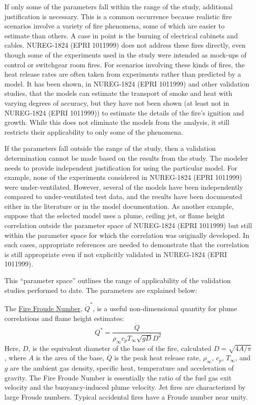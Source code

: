 \documentclass[fleqn,b5paper]{article}
\begin{document}
If only some of the parameters fall within the range of the study, additional justification is necessary. This is a common occurrence because realistic fire scenarios involve a variety of fire phenomena, some of which are easier to estimate than others. A case in point is the burning of electrical cabinets and cables. NUREG-1824 (EPRI 1011999) does not address these fires directly, even though some of the experiments used in the study were intended as mock-ups of control or switchgear room fires. For scenarios involving these kinds of fires, the heat release rates are often taken from experiments rather than predicted by a model. It has been shown, in NUREG-1824 (EPRI 1011999) and other validation studies, that the models can estimate the transport of smoke and heat with varying degrees of accuracy, but they have not been shown (at least not in NUREG-1824 (EPRI 1011999)) to estimate the details of the fire's ignition and growth. While this does not eliminate the models from the analysis, it still restricts their applicability to only some of the phenomena.

If the parameters fall outside the range of the study, then a validation determination cannot be made based on the results from the study. The modeler needs to provide independent justification for using the particular model. For example, none of the experiments considered in NUREG-1824 (EPRI 1011999) were under-ventilated. However, several of the models have been independently compared to under-ventilated test data, and the results have been documented either in the literature or in the model documentation. As another example, suppose that the selected model uses a plume, ceiling jet, or flame height correlation outside the parameter space of NUREG-1824 (EPRI 1011999) but still within the parameter space for which the correlation was originally developed. In such cases, appropriate references are needed to demonstrate that the correlation is still appropriate even if not explicitly validated in NUREG-1824 (EPRI 1011999).

This ``parameter space'' outlines the range of applicability of the validation studies performed to date. The parameters are explained below:

The \underline{Fire Froude Number}, $\dot{Q}^*$, is a useful non-dimensional quantity for plume correlations and flame height estimates:
\begin{equation} Q^* = \frac{\dot{Q}}{\rho_\infty c_p T_\infty \sqrt{gD} D^2} \end{equation}
Here, $D$, is the equivalent diameter of the base of the fire, calculated $D=\sqrt{4A/\pi}$, where $A$ is the area of the base, $\dot{Q}$ is the peak heat release rate, $\rho_\infty$, $c_p$, $T_\infty$, and $g$ are the ambient gas density, specific heat, temperature and acceleration of gravity. The Fire Froude Number is essentially the ratio of the fuel gas exit velocity and the buoyancy-induced plume velocity. Jet fires are characterized by large Froude numbers. Typical accidental fires have a Froude number near unity.
\end{document}
